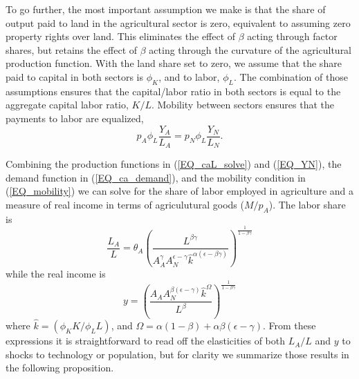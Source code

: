 \documentclass[11pt]{article}
\begin{document}
To go further, the most important assumption we make is that the share of output paid to land in the agricultural sector is zero, equivalent to assuming zero property rights over land. This eliminates the effect of $\beta$ acting through factor shares, but retains the effect of $\beta$ acting through the curvature of the agricultural production function. With the land share set to zero, we assume that the share paid to capital in both sectors is $\phi_K$, and to labor, $\phi_L$. The combination of those assumptions ensures that the capital/labor ratio in both sectors is equal to the aggregate capital labor ratio, $K/L$. Mobility between sectors ensures that the payments to labor are equalized,
\begin{equation}
    p_A \phi_L \frac{Y_A}{L_A} = p_N \phi_L \frac{Y_N}{L_N}. \label{EQ_mobility}
\end{equation}

Combining the production functions in (\ref{EQ_caL_solve}) and (\ref{EQ_YN}), the demand function in (\ref{EQ_ca_demand}), and the mobility condition in (\ref{EQ_mobility}) we can solve for the share of labor employed in agriculture and a measure of real income in terms of agriculutural goods ($M/p_A$). The labor share is
\begin{equation}
	\frac{L_A}{L} = \theta_A \left(\frac{L^{\beta\gamma}}{A_A^{\gamma} A_N^{\epsilon - \gamma} \hat{k}^{\alpha(\epsilon - \beta\gamma)}}\right)^{\frac{1}{1-\beta\gamma}} \label{EQ_LAL}
\end{equation}
while the real income is
\begin{equation}
	y = \left(\frac{A_A A_N^{\beta(\epsilon-\gamma)}\hat{k}^{\Omega}}{L^{\beta}} \right)^{\frac{1}{1-\beta\gamma}} \label{EQ_y}
\end{equation}
where $\hat{k} = (\phi_K K/\phi_L L)$, and $\Omega = \alpha(1-\beta) + \alpha\beta(\epsilon-\gamma)$. From these expressions it is straightforward to read off the elasticities of both $L_A/L$ and $y$ to shocks to technology or population, but for clarity we summarize those results in the following proposition. 
\end{document}
